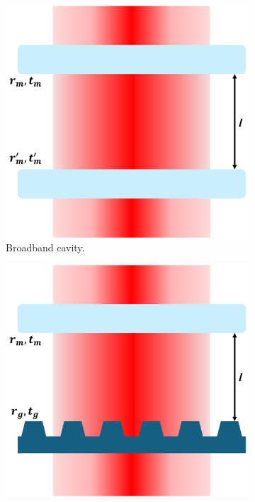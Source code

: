 \begin{figure}[h!]
    \centering
    \begin{subfigure}[b]{0.3\textwidth}
        \includegraphics[width=\textwidth]{figures/broadband_sketch.pdf}
        \caption{Broadband cavity.}
        \label{fig:broadband_cavity_sketch}
    \end{subfigure}
    \hfill
    \begin{subfigure}[b]{0.3\textwidth}
        \includegraphics[width=\textwidth]{figures/single_fano_sketch.pdf}

\end{subfigure}
\end{figure}
